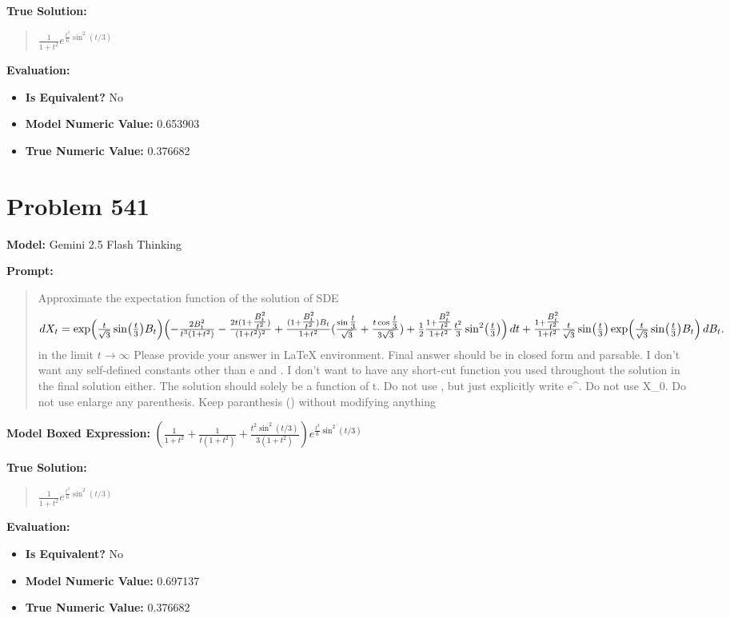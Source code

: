 \documentclass{article}
\begin{document}
\textbf{True Solution:}
\begin{quote}
$\frac{1}{1 + t^2} e^{\frac{t^3}{6} \sin^2(t/3)}$
\end{quote}

\textbf{Evaluation:}
\begin{itemize}
\item \textbf{Is Equivalent?} No
\item \textbf{Model Numeric Value:} 0.653903
\item \textbf{True Numeric Value:} 0.376682
\end{itemize}
\vspace{1cm}
\section*{Problem 541}
\textbf{Model:} Gemini 2.5 Flash Thinking

\textbf{Prompt:}
\begin{quote}
Approximate the expectation function of the solution of SDE $$ dX_t=\exp\Bigl(\tfrac{t}{\sqrt3}\sin\bigl(\tfrac{t}{3}\bigr)B_t\Bigr)\Bigl(-\tfrac{2B_t^2}{t^3(1+t^2)}-\tfrac{2t(1+\tfrac{B_t^2}{t^2})}{(1+t^2)^2}+\tfrac{(1+\tfrac{B_t^2}{t^2})B_t}{1+t^2}(\tfrac{\sin\tfrac{t}{3}}{\sqrt3}+\tfrac{t\cos\tfrac{t}{3}}{3\sqrt3})+\tfrac12\tfrac{1+\tfrac{B_t^2}{t^2}}{1+t^2}\tfrac{t^2}{3}\sin^2\bigl(\tfrac{t}{3}\bigr)\Bigr)\,dt+\tfrac{1+\tfrac{B_t^2}{t^2}}{1+t^2}\tfrac{t}{\sqrt3}\sin\bigl(\tfrac{t}{3}\bigr)\exp\Bigl(\tfrac{t}{\sqrt3}\sin\bigl(\tfrac{t}{3}\bigr)B_t\Bigr)\,dB_t.$$ in the limit $t \to \infty$ Please provide your answer in LaTeX \boxed{} environment. Final answer should be in closed form and parsable. I don't want any self-defined constants other than e and \pi. I don't want to have any short-cut function you used throughout the solution in the final solution either. The solution should solely be a function of t. Do not use \exp, but just explicitly write e^. Do not use X_0. Do not use enlarge any parenthesis. Keep paranthesis () without modifying anything
\end{quote}
\textbf{Model Boxed Expression:} $\left(\frac{1}{1+t^2} + \frac{1}{t(1+t^2)} + \frac{t^2 \sin^2(t/3)}{3(1+t^2)}\right)e^{\frac{t^3}{6}\sin^2(t/3)}$

\textbf{True Solution:}
\begin{quote}
$\frac{1}{1 + t^2} e^{\frac{t^3}{6} \sin^2(t/3)}$
\end{quote}

\textbf{Evaluation:}
\begin{itemize}
\item \textbf{Is Equivalent?} No
\item \textbf{Model Numeric Value:} 0.697137
\item \textbf{True Numeric Value:} 0.376682
\end{itemize}
\vspace{1cm}
\end{document}
